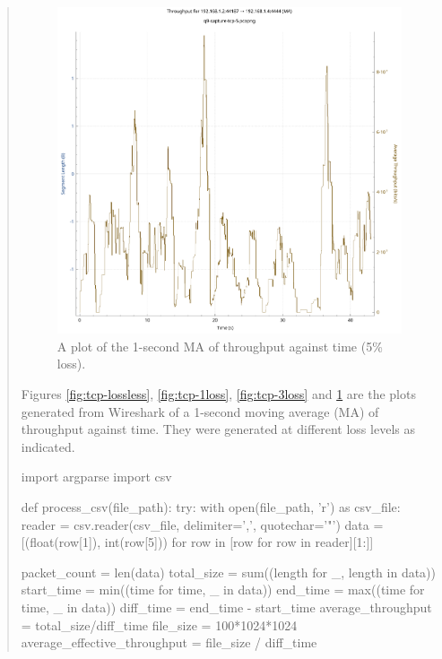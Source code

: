 \documentclass{article}
\newenvironment{ans}
{\fbox{Answer}\begin{quote}\nopagebreak}
{\end{quote}}
\begin{document}
\begin{ans}
\begin{figure}[H]
\centering
\includegraphics[width=16cm]{data/q9-1msav-throughput-5loss.pdf}
\caption{A plot of the 1-second MA of throughput against time
(5\% loss).}
\label{fig:tcp-5loss}
\end{figure}

Figures \ref{fig:tcp-lossless}, \ref{fig:tcp-1loss},
\ref{fig:tcp-3loss} and \ref{fig:tcp-5loss} are the plots
generated from Wireshark of a 1-second moving average (MA)
of throughput against time. They were generated at
different loss levels as indicated.

\begin{gruvboxlisting}[language=Python,caption={A Python script for computing a
number of statistics about any Wireshark capture.},label={lst:python-scritp}]
import argparse
import csv

def process_csv(file_path): try: with open(file_path, 'r')
as csv_file: reader = csv.reader(csv_file, delimiter=',',
quotechar='"') data = [(float(row[1]), int(row[5])) for row
in [row for row in reader][1:]]

packet_count = len(data) total_size = sum((length for _,
length in data)) start_time = min((time for time, _ in
data)) end_time = max((time for time, _ in data)) diff_time
= end_time - start_time average_throughput =
total_size/diff_time file_size = 100*1024*1024
average_effective_throughput = file_size / diff_time


\end{gruvboxlisting}
\end{ans}
\end{document}
